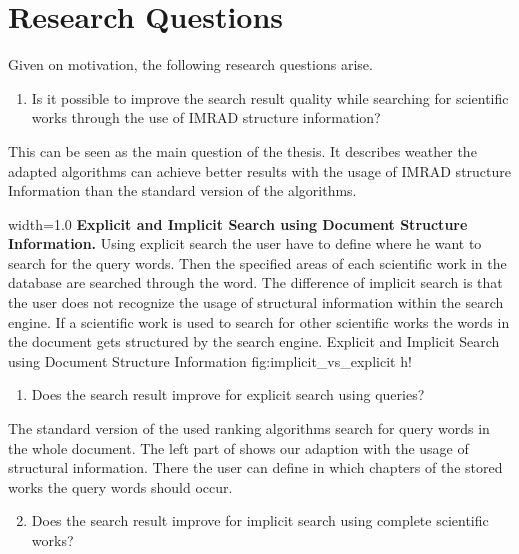 \section{Research Questions}
\label{sec:research_questions}

Given on motivation, the following research questions arise.

\begin{enumerate}
  \item Is it possible to improve the search result quality while searching for scientific works through the use of IMRAD structure information?
\end{enumerate}

This can be seen as the main question of the thesis. It describes weather the adapted algorithms can achieve better results with the usage of IMRAD structure Information than the standard version of the algorithms.

      {width=1.0\textwidth}
      {\textbf{Explicit and Implicit Search using Document Structure Information.} Using explicit search the user have to define where he want to search for the query words. Then the specified areas of each scientific work in the database are searched through the word. The difference of implicit search is that the user does not recognize the usage of structural information within the search engine. If a scientific work is used to search for other scientific works the words in the document gets structured by the search engine.}
      {Explicit and Implicit Search using Document Structure Information}
      {fig:implicit_vs_explicit}
      {h!}

\begin{enumerate}[label=1.\arabic*]
  \item Does the search result improve for explicit search using queries?
\end{enumerate}

The standard version of the used ranking algorithms search for query words in the whole document. The left part of  shows our adaption with the usage of structural information. There the user can define in which chapters of the stored works the query words should occur.

\begin{enumerate}[label=1.\arabic*]
  \setcounter{enumi}{1}
  \item Does the search result improve for implicit search using complete scientific works?
\end{enumerate}

